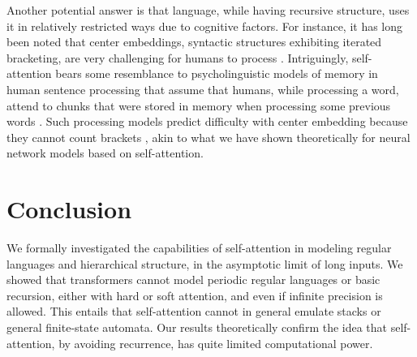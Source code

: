 \documentclass[11pt,a4paper]{article}
\begin{document}



Another potential answer is that language, while having recursive structure, uses it in relatively restricted ways due to cognitive factors.
For instance, it has long been noted that center embeddings, syntactic structures exhibiting iterated bracketing, are very challenging for humans to process \cite{miller-finitary-1963,gibson1999memory}.
Intriguingly, self-attention bears some resemblance to psycholinguistic models of memory in human sentence processing that assume that humans, while processing a word, attend to chunks that were stored in memory when processing some previous words \cite{lewis2005activation,parker2017cue}.
Such processing models predict difficulty with center embedding because they cannot count brackets \cite{lewis2005activation}, akin to what we have shown theoretically for neural network models based on self-attention.






\section{Conclusion}
We formally investigated the capabilities of self-attention in modeling regular languages and hierarchical structure, in the asymptotic limit of long inputs.
We showed that transformers cannot model periodic regular languages or basic recursion, either with hard or soft attention, and even if infinite precision is allowed. %
This entails that self-attention cannot in general emulate stacks or general finite-state automata.
Our results theoretically confirm the idea that self-attention, by avoiding recurrence, has quite limited computational power.





\end{document}
